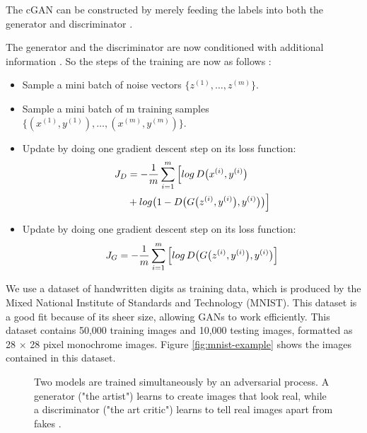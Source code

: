 \documentclass[journal]{IEEEtran}
\begin{document}
{{The cGAN can be constructed by merely feeding the labels  into both the generator and discriminator \cite{DBLP:journals/corr/MirzaO14}.

The generator  and the discriminator  are now conditioned with  additional information . So the steps of the training are now as follows \cite{DBLP:journals/corr/IsolaZZE16}:

\begin{itemize}
	\item Sample a mini batch of  noise vectors \( \{z^{(1)},\dots,z^{(m)}\} \).
	\item Sample a mini batch of m  training samples \( \{(x^{(1)},y^{(1)}),\dots,(x^{(m)},y^{(m)})\} \).
	\item Update    by doing one gradient descent step on its loss function:
	\begin{equation}
	\begin{split}
	J_D &= - \frac{1}{m} \sum_{i=1}^{m} \Big[log \thinspace D\big(x^{(i)}, y^{(i)}\big)\\
	&+log\big(1 - D\big(G\big(z^{(i)},y^{(i)}\big),y^{(i)}\big)\big)\Big]
	\label{eq:J_D}
	\end{split}	
	\end{equation}
	\item Update    by doing one gradient descent step on its loss function: 
	\begin{equation}
	J_G = - \frac{1}{m} \sum_{i=1}^{m} \Big[log \thinspace D\big(G\big(z^{(i)},y^{(i)}\big),y^{(i)}\big)\Big]
	\label{eq:J_G}
	\end{equation}
\end{itemize}

We use a dataset of handwritten digits as training data, which is produced by the Mixed National Institute of Standards and Technology (MNIST). This dataset is a good fit because of its sheer size, allowing GANs to work efficiently. This dataset contains 50,000 training images and 10,000 testing images, formatted as 28 \(\times\) 28 pixel monochrome images. Figure \ref{fig:mnist-example} shows the images contained in this dataset.

\begin{figure}[htp]
	\centering
	\caption{
		Two models are trained simultaneously by an adversarial process. A generator ("the artist") learns to create images that look real, while a discriminator ("the art critic") learns to tell real images apart from fakes \cite{tensorflow2020}.
	}
	\label{fig:gan-forward-step}
\end{figure}


}}
\end{document}
